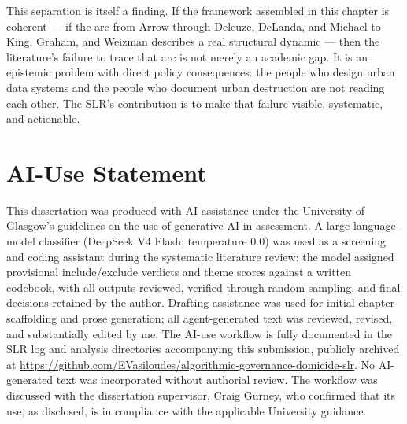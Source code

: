 \documentclass[12pt,a4paper,twoside]{report}
\begin{document}
This separation is itself a finding. If the framework assembled in this chapter is coherent — if the arc from Arrow through Deleuze, DeLanda, and Michael to King, Graham, and Weizman describes a real structural dynamic — then the literature's failure to trace that arc is not merely an academic gap. It is an epistemic problem with direct policy consequences: the people who design urban data systems and the people who document urban destruction are not reading each other. The SLR's contribution is to make that failure visible, systematic, and actionable.








\printbibliography[heading=bibintoc]

\appendix

\chapter{AI-Use Statement}
\label{app:ai-statement}

This dissertation was produced with AI assistance under the University of Glasgow's guidelines on the use of generative AI in assessment. A large-language-model classifier (DeepSeek V4 Flash; temperature 0.0) was used as a screening and coding assistant during the systematic literature review: the model assigned provisional include/exclude verdicts and theme scores against a written codebook, with all outputs reviewed, verified through random sampling, and final decisions retained by the author. Drafting assistance was used for initial chapter scaffolding and prose generation; all agent-generated text was reviewed, revised, and substantially edited by me. The AI-use workflow is fully documented in the SLR log and analysis directories accompanying this submission, publicly archived at \url{https://github.com/EVasiloudes/algorithmic-governance-domicide-slr}. No AI-generated text was incorporated without authorial review. The workflow was discussed with the dissertation supervisor, Craig Gurney, who confirmed that its use, as disclosed, is in compliance with the applicable University guidance.


\end{document}
